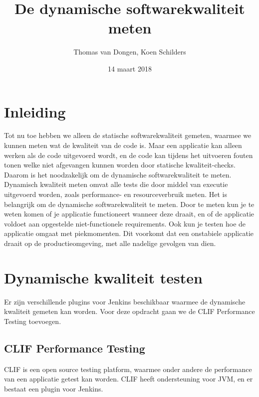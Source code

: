 \documentclass[12pt]{article}
\title{De dynamische softwarekwaliteit meten}
\author{Thomas van Dongen, Koen Schilders}
\date{14 maart 2018}
\begin{document}
\begin{titlepage}
\maketitle
\end{titlepage}

\section{Inleiding}



Tot nu toe hebben we alleen de statische softwarekwaliteit gemeten, waarmee we kunnen meten wat de kwaliteit van de code is. Maar een applicatie kan alleen werken als de code uitgevoerd wordt, en de code kan tijdens het uitvoeren fouten tonen welke niet afgevangen kunnen worden door statische kwaliteit-checks. Daarom is het noodzakelijk om de dynamische softwarekwaliteit te meten. Dynamisch kwaliteit meten omvat alle tests die door middel van executie uitgevoerd worden, zoals performance- en resourceverbruik meten.
Het is belangrijk om de dynamische softwarekwaliteit te meten. Door te meten kun je te weten komen of je applicatie functioneert wanneer deze draait, en of de applicatie voldoet aan opgestelde niet-functionele requirements. Ook kun je testen hoe de applicatie omgaat met piekmomenten. Dit voorkomt dat een onstabiele applicatie draait op de productieomgeving, met alle nadelige gevolgen van dien.


\section{Dynamische kwaliteit testen}
Er zijn verschillende plugins voor Jenkins beschikbaar waarmee de dynamische kwaliteit gemeten kan worden. Voor deze opdracht gaan we de CLIF Performance Testing\textsuperscript{\cite{jenkins_clif_plugin}} toevoegen.

\subsection{CLIF Performance Testing}
CLIF\textsuperscript{\cite{clif}} is een open source testing platform, waarmee onder andere de performance van een applicatie getest kan worden. CLIF heeft ondersteuning voor JVM, en er bestaat een plugin voor Jenkins\textsuperscript{\cite{jenkins_clif_plugin}}.
\end{document}
